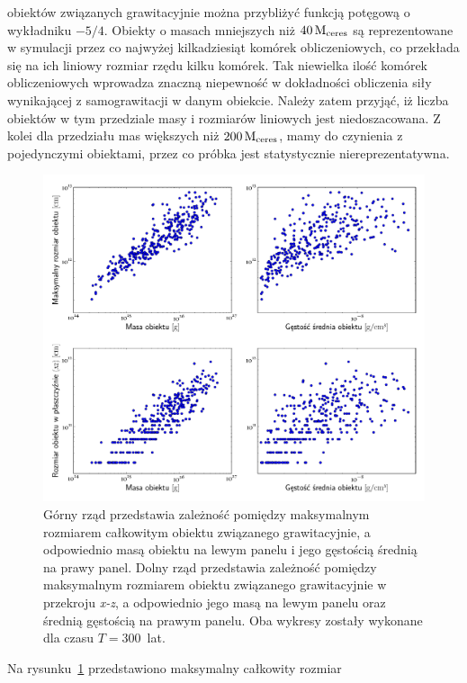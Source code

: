obiektów związanych grawitacyjnie można przybliżyć funkcją potęgową o wykładniku
$-5/4$. Obiekty o masach mniejszych niż $40\hbox{$\mathrm{\thinspace M_{\textrm{ceres}}}$}$ są reprezentowane w
symulacji przez co najwyżej kilkadziesiąt komórek obliczeniowych, co przekłada
się na ich liniowy rozmiar rzędu kilku komórek. Tak niewielka ilość komórek
obliczeniowych wprowadza znaczną niepewność w dokładności obliczenia
siły wynikającej z samograwitacji w danym obiekcie. Należy zatem przyjąć, iż
liczba obiektów w tym przedziale masy i rozmiarów liniowych jest 
niedoszacowana. Z kolei dla przedziału mas większych niż $200\hbox{$\mathrm{\thinspace M_{\textrm{ceres}}}$}$, mamy
do czynienia z pojedynczymi obiektami, przez co próbka jest statystycznie
niereprezentatywna.
%
\begin{figure}[ht]
   \centering
   \includegraphics[width=0.99\linewidth]{figures/fig_mass_size}
   \caption[Zależności pomiędzy rozmiarami obiektów związanych grawitacyjnie, a
   ich masami i gęstościami.]
     {Górny rząd przedstawia zależność pomiędzy maksymalnym rozmiarem
      całkowitym obiektu związanego grawitacyjnie, a odpowiednio masą obiektu na
      lewym panelu i jego gęstością średnią na prawy panel. Dolny rząd
      przedstawia zależność pomiędzy maksymalnym rozmiarem obiektu związanego
   grawitacyjnie w przekroju \emph{x-z}, a odpowiednio jego masą na lewym panelu
oraz średnią gęstością na prawym panelu. Oba  wykresy zostały wykonane dla czasu
$T=300$~lat. }
   \label{fig:mass_size}
\end{figure}
%
\par Na rysunku~\ref{fig:mass_size} przedstawiono maksymalny całkowity rozmiar

